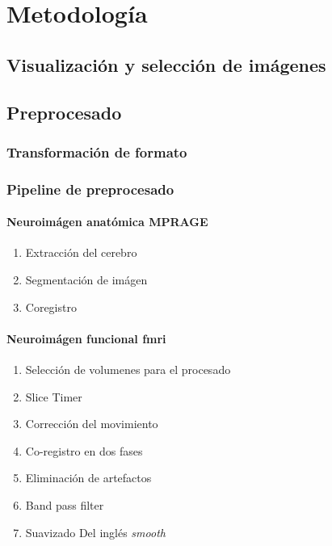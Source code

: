 \chapter{Metodología}

\section{Visualización y selección de imágenes}
\section{Preprocesado}
\subsection{Transformación de formato}
\subsection{Pipeline de preprocesado}
\subsubsection{Neuroimágen anatómica MPRAGE}

\begin{enumerate}
\item Extracción del cerebro
\item Segmentación de imágen
\item Coregistro
\end{enumerate}

\subsubsection{Neuroimágen funcional fmri}

\begin{enumerate}
\item Selección de volumenes para el procesado
\item Slice Timer
\item Corrección del movimiento 
\item Co-registro en dos fases
\item Eliminación de artefactos
\item Band pass filter
\item Suavizado Del inglés \textit{smooth}
\end{enumerate}

